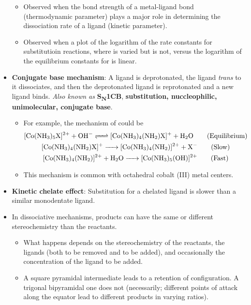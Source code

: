 \documentclass[../notes.tex]{subfiles}
\begin{document}
\begin{itemize}
    \begin{itemize}
        \item Observed when the bond strength of a metal-ligand bond (thermodynamic parameter) plays a major role in determining the dissociation rate of a ligand (kinetic parameter).
        \item Observed when a plot of the logarithm of the rate constants for  substitutioin reactions, where  is varied but  is not, versus the logarithm of the equilibrium constants for  is linear.
    \end{itemize}
    \item \textbf{Conjugate base mechanism}: A ligand is deprotonated, the ligand \emph{trans} to it dissociates, and then the deprotonated ligand is reprotonated and a new ligand binds. \emph{Also known as} \textbf{S\textsubscript{N}1CB}, \textbf{substitution, nuccleophilic, unimolecular, conjugate base}.
    \begin{itemize}
        \item For example, the mechanism of  could be
        \begin{gather*}
            \ce{[Co(NH3)5X]^2+ + OH- <=> [Co(NH3)4(NH2)X]+ + H2O}\tag{Equilibrium}\\
            \ce{[Co(NH3)4(NH2)X]+ -> [Co(NH3)4(NH2)]^2+ + X-}\tag{Slow}\\
            \ce{[Co(NH3)4(NH2)]^2+ + H2O -> [Co(NH3)5(OH)]^2+}\tag{Fast}
        \end{gather*}
        \item This mechanism is common with octahedral cobalt (III) metal centers.
    \end{itemize}
    \item \textbf{Kinetic chelate effect}: Substitution for a chelated ligand is slower than a similar monodentate ligand.
    \item In dissociative mechanisms, products can have the same or different stereochemistry than the reactants.
    \begin{itemize}
        \item What happens depends on the stereochemistry of the reactants, the ligands (both to be removed and to be added), and occasionally the concentration of the ligand to be added.
        \item A square pyramidal intermediate leads to a retention of configuration. A trigonal bipyramidal one does not (necessarily; different points of attack along the equator lead to different products in varying ratios).

\end{itemize}
\end{itemize}
\end{document}
